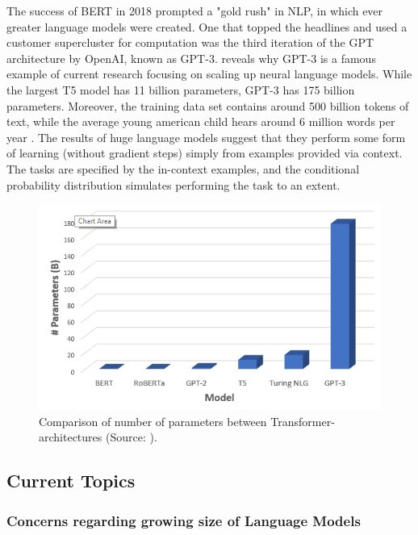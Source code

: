 \documentclass[
]{krantz}
\begin{document}
The success of BERT in 2018 prompted a "gold rush" in NLP, in which
ever greater language models were created. One that topped the headlines
and used a customer supercluster for computation was the third iteration
of the GPT architecture by OpenAI, known as GPT-3. reveals why GPT-3 is
a famous example of current research focusing on scaling up neural
language models. While the largest T5 model has 11 billion parameters,
GPT-3 has 175 billion parameters. Moreover, the training data set
contains around 500 billion tokens of text, while the average young
american child hears around 6 million words per year \citep{Hart1995}.
The results of huge language models suggest that they perform some form
of learning (without gradient steps) simply from examples provided via
context. The tasks are specified by the in-context examples, and the
conditional probability distribution simulates performing the task to an
extent.

\begin{figure}

{\centering \includegraphics[width=0.7\linewidth]{./figures/01-01-nlp/gpt3_comparison} 

}

\caption{Comparison of number of parameters between Transformer-architectures (Source: \citet{Saifee2020}).}\label{fig:gpt3scaling}
\end{figure}



\hypertarget{current-topics}{%
\subsection{Current Topics}\label{current-topics}}

\hypertarget{sec:concerns-lm}{%
\subsubsection{Concerns regarding growing size of Language Models}\label{sec:concerns-lm}}
\end{document}
